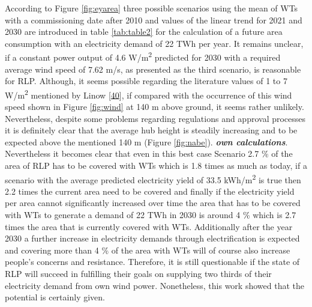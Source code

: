 \documentclass[a4paper,11pt]{article}
\begin{document}
According to Figure \ref{fig:eyarea} three possible scenarios using the mean of WTs with a commissioning date after 2010 and values of the linear trend for 2021 and 2030 are introduced in table \ref{tab:table2} for the calculation of a future area consumption with an electricity demand of 22 TWh per year. It remains unclear, if a constant power output of 4.6 W/m\textsuperscript{2} predicted for 2030 with a required average wind speed of 7.62 m/s, as presented as the third scenario, is reasonable for RLP. Although, it seems possible regarding the literature values of 1 to 7 W/m\textsuperscript{2} mentioned by Linow {[}\protect\hyperlink{ref-SvenLinow.2020}{40}{]}, if compared with the occurrence of this wind speed shown in Figure \ref{fig:wind} at 140 m above ground, it seems rather unlikely. Nevertheless, despite some problems regarding regulations and approval processes it is definitely clear that the average hub height is steadily increasing and to be expected above the mentioned 140 m (Figure \ref{fig:nabe}). \textbf{\emph{own calculations}}. Nevertheless it becomes clear that even in this best case Scenario 2.7 \% of the area of RLP has to be covered with WTs which is 1.8 times as much as today, if a scenario with the average predicted electricity yield of 33.5 kWh/m\textsuperscript{2} is true then 2.2 times the current area need to be covered and finally if the electricity yield per area cannot significantly increased over time the area that has to be covered with WTs to generate a demand of 22 TWh in 2030 is around 4 \% which is 2.7 times the area that is currently covered with WTs. Additionally after the year 2030 a further increase in electricity demands through electrification is expected and covering more than 4 \% of the area with WTs will of course also increase people's concerns and resistance. Therefore, it is still questionable if the state of RLP will succeed in fulfilling their goals on supplying two thirds of their electricity demand from own wind power. Nonetheless, this work showed that the potential is certainly given.
\end{document}

